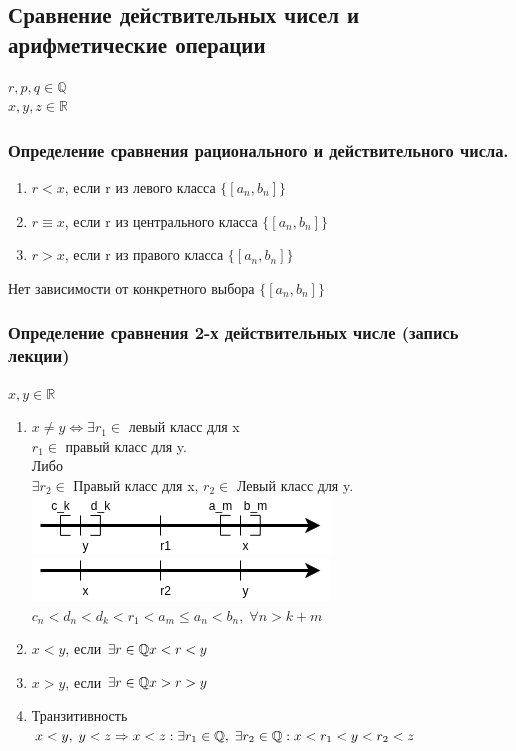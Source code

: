 \documentclass[12pt, paper]{article}
\newcommand{\Q}{\mathbb{Q}}
\newcommand{\R}{\mathbb{R}}
\begin{document}
\subsection{Сравнение действительных чисел и арифметические операции}
$r, p, q \in \Q$\\
$x, y, z \in \R$
\subsubsection{Определение сравнения рационального и действительного числа.}
\begin{tcolorbox}
\begin{enumerate}
    \item $r < x$, если r из левого класса $\{ [a_n,b_n] \}$
    \item $r \equiv x$, если r из центрального класса $\{ [a_n,b_n] \}$
    \item $r > x$, если r из правого класса $\{ [a_n,b_n] \}$
\end{enumerate}
\end{tcolorbox}
Нет зависимости от конкретного выбора $\{ [a_n,b_n] \}$\\
\subsubsection{Определение сравнения 2-х действительных числе (запись лекции)}
\begin{tcolorbox}
    $x, y \in \R$
    \begin{enumerate}
    \item $x \not= y \Leftrightarrow \exists r_1 \in $ левый класс для x\\
    $ r_1 \in $ правый класс для y.\\
    Либо\\
    $\exists r_2 \in $ Правый класс для x, $r_2 \in$ Левый класс для y.\\
    \includegraphics[width=0.5\linewidth]{images/Действительные числа/Сравнение действительных чисел.png}
    \includegraphics[width=0.5\linewidth]{images/Действительные числа/Сравнение действительных чисел2.png}\\
    $c_n < d_n < d_k < r_1 < a_m \leq a_n < b_n,\; \forall n > k+m$
        \item $x < y$, если $\exists r \in \Q\\ x < r < y$
        \item $x > y$, если $\exists r \in \Q\\ x > r > y$
        \item Транзитивность $x < y,\; y < z \Rightarrow x < z:\\
        \exists r_1 \in \Q,\; \exists r_2 \in \Q: x < r_1 < y < r_2 < z$
    \end{enumerate}
\end{tcolorbox}
\end{document}
